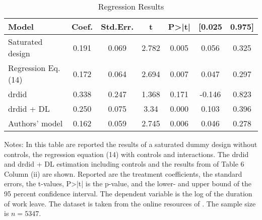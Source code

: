 \begin{table}[ht]
\centering
\begin{threeparttable}
\caption{Regression Results}
\label{tab:reg_results}
\begin{tabular}{lcccccc}
\toprule
\hline
\addlinespace
Model & Coef. & Std.Err. & t & P>|t| & [0.025 & 0.975] \\
\midrule
Saturated design & 0.191 & 0.069 & 2.782 & 0.005 & 0.056 & 0.325 \\
Regression Eq. (14)  & 0.172 & 0.064 & 2.694 & 0.007 & 0.047 & 0.297 \\
\ac{drdid} & 0.338 & 0.247 & 1.368 & 0.171 & -0.146 & 0.823 \\
\ac{drdid} + DL & 0.250 & 0.075 & 3.34 & 0.000 & 0.103 & 0.396\\
Authors' model & 0.162 & 0.059 &  2.745 & 0.006 & 0.046 & 0.278 \\
\bottomrule
\end{tabular}
\begin{tablenotes}
    \item Notes: In this table are reported the results of a saturated dummy design without controls, the regression equation (14) with controls and interactions. The \ac{drdid} and \ac{drdid} + DL estimation including controls and the results from \citet{meyer1990workers} of Table 6 Column (ii) are shown. Reported are the treatment coefficients, the standard errors, the t-values, P>|t| is the p-value, and the lower- and upper bound of the 95 percent confidence interval. The dependent variable is the log of the duration of work leave. The dataset is taken from the online resources of \citet{wooldridge2019introductory}. The sample size is $n = 5347$.
\end{tablenotes}
\end{threeparttable}
\end{table}
